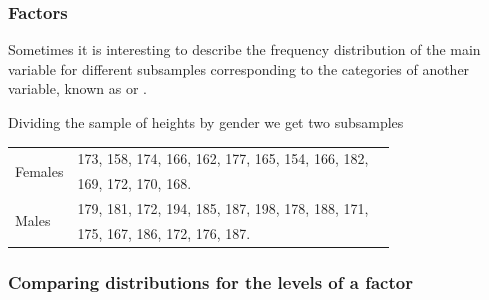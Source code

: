 \begin{frame}
\frametitle{Factors}
Sometimes it is interesting to describe the frequency distribution of the main variable for different subsamples
corresponding to the categories of another variable, known as  or
.

 Dividing the sample of heights by gender we get two subsamples
\begin{center}
\begin{tabular}{lll}
\hline
\multirow{2}{*}{Females} &
173, 158, 174, 166, 162, 177, 165, 154, 166, 182, \\
& 169, 172, 170, 168. \\
\hline
\multirow{2}{*}{Males} &
179, 181, 172, 194, 185, 187, 198, 178, 188, 171,\\
& 175, 167, 186, 172, 176, 187. \\
\hline
\end{tabular}
\end{center}
\end{frame}


\begin{frame}
\frametitle{Comparing distributions for the levels of a factor }

\begin{center} 
\scalebox{0.45}{}
\scalebox{0.45}{}
\end{center}
\end{frame}
